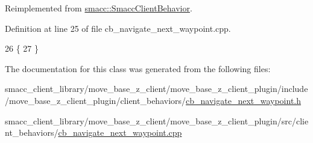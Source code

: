 Reimplemented from \hyperlink{classsmacc_1_1SmaccClientBehavior_a7e4fb6ce81ff96dc172425852d69c0c5}{smacc\+::\+Smacc\+Client\+Behavior}.



Definition at line 25 of file cb\+\_\+navigate\+\_\+next\+\_\+waypoint.\+cpp.


\begin{DoxyCode}
26     \{
27     \}
\end{DoxyCode}


The documentation for this class was generated from the following files\+:\begin{DoxyCompactItemize}
\item 
smacc\+\_\+client\+\_\+library/move\+\_\+base\+\_\+z\+\_\+client/move\+\_\+base\+\_\+z\+\_\+client\+\_\+plugin/include/move\+\_\+base\+\_\+z\+\_\+client\+\_\+plugin/client\+\_\+behaviors/\hyperlink{cb__navigate__next__waypoint_8h}{cb\+\_\+navigate\+\_\+next\+\_\+waypoint.\+h}\item 
smacc\+\_\+client\+\_\+library/move\+\_\+base\+\_\+z\+\_\+client/move\+\_\+base\+\_\+z\+\_\+client\+\_\+plugin/src/client\+\_\+behaviors/\hyperlink{cb__navigate__next__waypoint_8cpp}{cb\+\_\+navigate\+\_\+next\+\_\+waypoint.\+cpp}\end{DoxyCompactItemize}

